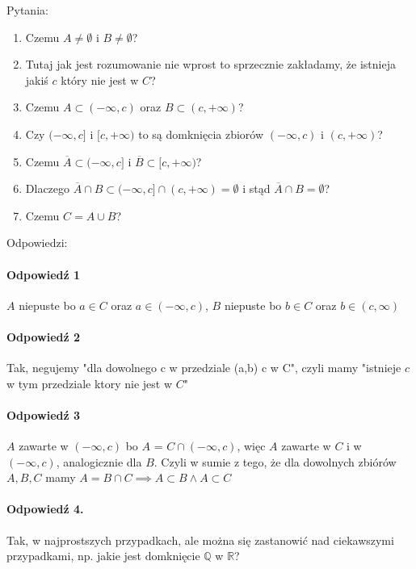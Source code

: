 \documentclass{article}
\begin{document}
Pytania:
\begin{enumerate}
    \item  \checkmark Czemu \(A \neq \emptyset\) i \(B \neq \emptyset\)?
    \item \checkmark Tutaj jak jest rozumowanie nie wprost to sprzecznie zakładamy, że istnieja jakiś \(c\) który nie jest w \(C\)?
    \item \checkmark Czemu \(A \subset (- \infty, c)\) oraz \(B \subset (c, + \infty)\)?
    \item \checkmark Czy \((- \infty, c]\) i \([c, + \infty)\) to są domknięcia zbiorów \((- \infty, c)\) i \((c, + \infty)\)?
    \item \checkmark Czemu \(\overline{A} \subset (- \infty, c] \) i \(\overline{B} \subset [c, +\infty)\)?
    \item \checkmark Dlaczego \(\overline{A} \cap B \subset (-\infty, c] \cap (c, + \infty) = \emptyset \) i stąd \(\overline{A} \cap B = \emptyset\)?
    \item \checkmark Czemu \(C = A \cup B\)?
\end{enumerate}




Odpowiedzi:



\paragraph{Odpowiedź 1}
\(A\) niepuste bo \(a \in C\) oraz \(a \in (-\infty, c)\), \(B\) niepuste bo \(b \in C\) oraz \(b \in (c, \infty) \)

\paragraph{Odpowiedź 2}
Tak, negujemy "dla dowolnego c w przedziale (a,b) c w C", czyli mamy "istnieje \(c\) w tym przedziale ktory nie jest w \(C\)"

\paragraph{Odpowiedź 3}
\(A\) zawarte w \((- \infty, c)\) bo \(A\) = \(C \cap (- \infty, c) \), więc \(A\) zawarte w \(C\) i w \((- \infty, c)\), analogicznie dla \(B\). Czyli w sumie
z tego, że dla dowolnych zbiórów \(A, B, C\) mamy \(A = B \cap C \implies A \subset B \land A \subset C\)

\paragraph{Odpowiedź 4.} Tak, w najprostszych przypadkach, ale można się zastanowić nad 
ciekawszymi przypadkami, np. jakie jest domknięcie \(\mathbb{Q}\) w \(\mathbb{R}\)?
\end{document}
